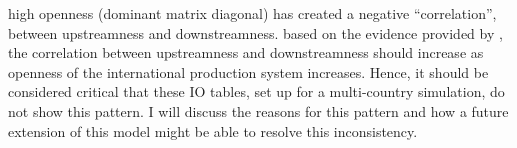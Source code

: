 high openness (dominant matrix diagonal) has created a negative ``correlation'', between upstreamness and downstreamness. based on the evidence provided by 
\textcite{antras2018MeasurementUpstreamnessDownstreamness}, the correlation between upstreamness and downstreamness should increase as openness of the 
international production system increases. Hence, it should be considered critical that these IO tables, set up for a multi-country simulation, do not show 
this pattern. I will discuss the reasons for this pattern and how a future extension of this model might be able to resolve this inconsistency.


